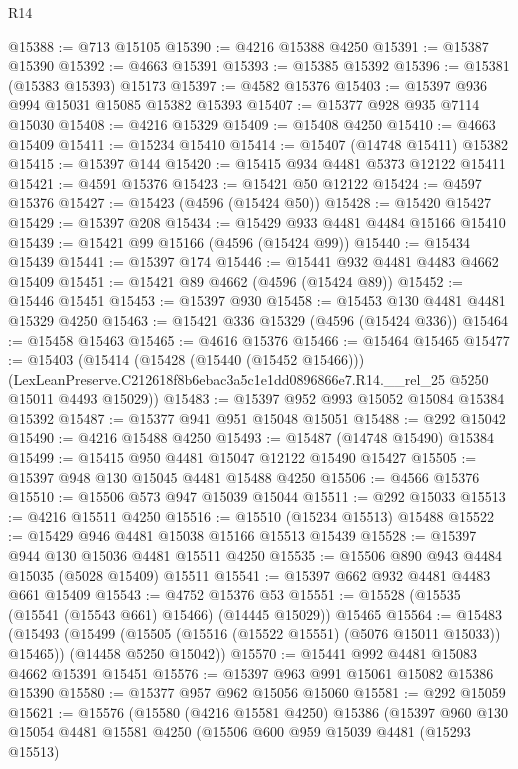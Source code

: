 \begin{lexlean}{R14}
\begin{coremodule}
@15388 := @713 @15105
@15390 := @4216 @15388 @4250
@15391 := @15387 @15390
@15392 := @4663 @15391
@15393 := @15385 @15392
@15396 := @15381 (@15383 @15393) @15173
@15397 := @4582 @15376
@15403 := @15397 @936 @994 @15031 @15085 @15382 @15393
@15407 := @15377 @928 @935 @7114 @15030
@15408 := @4216 @15329
@15409 := @15408 @4250
@15410 := @4663 @15409
@15411 := @15234 @15410
@15414 := @15407 (@14748 @15411) @15382
@15415 := @15397 @144
@15420 := @15415 @934 @4481 @5373 @12122 @15411
@15421 := @4591 @15376
@15423 := @15421 @50 @12122
@15424 := @4597 @15376
@15427 := @15423 (@4596 (@15424 @50))
@15428 := @15420 @15427
@15429 := @15397 @208
@15434 := @15429 @933 @4481 @4484 @15166 @15410
@15439 := @15421 @99 @15166 (@4596 (@15424 @99))
@15440 := @15434 @15439
@15441 := @15397 @174
@15446 := @15441 @932 @4481 @4483 @4662 @15409
@15451 := @15421 @89 @4662 (@4596 (@15424 @89))
@15452 := @15446 @15451
@15453 := @15397 @930
@15458 := @15453 @130 @4481 @4481 @15329 @4250
@15463 := @15421 @336 @15329 (@4596 (@15424 @336))
@15464 := @15458 @15463
@15465 := @4616 @15376
@15466 := @15464 @15465
@15477 := @15403
    (@15414
      (@15428 (@15440 (@15452 @15466)))
      (LexLeanPreserve.C212618f8b6ebac3a5c1e1dd0896866e7.R14.__rel_25 @5250 @15011 @4493 @15029))
@15483 := @15397 @952 @993 @15052 @15084 @15384 @15392
@15487 := @15377 @941 @951 @15048 @15051
@15488 := @292 @15042
@15490 := @4216 @15488 @4250
@15493 := @15487 (@14748 @15490) @15384
@15499 := @15415 @950 @4481 @15047 @12122 @15490 @15427
@15505 := @15397 @948 @130 @15045 @4481 @15488 @4250
@15506 := @4566 @15376
@15510 := @15506 @573 @947 @15039 @15044
@15511 := @292 @15033
@15513 := @4216 @15511 @4250
@15516 := @15510 (@15234 @15513) @15488
@15522 := @15429 @946 @4481 @15038 @15166 @15513 @15439
@15528 := @15397 @944 @130 @15036 @4481 @15511 @4250
@15535 := @15506 @890 @943 @4484 @15035 (@5028 @15409) @15511
@15541 := @15397 @662 @932 @4481 @4483 @661 @15409
@15543 := @4752 @15376 @53
@15551 := @15528 (@15535 (@15541 (@15543 @661) @15466) (@14445 @15029)) @15465
@15564 := @15483
    (@15493
      (@15499 (@15505 (@15516 (@15522 @15551) (@5076 @15011 @15033)) @15465))
      (@14458 @5250 @15042))
@15570 := @15441 @992 @4481 @15083 @4662 @15391 @15451
@15576 := @15397 @963 @991 @15061 @15082 @15386 @15390
@15580 := @15377 @957 @962 @15056 @15060
@15581 := @292 @15059
@15621 := @15576
    (@15580
      (@4216 @15581 @4250)
      @15386
      (@15397
        @960
        @130
        @15054
        @4481
        @15581
        @4250
        (@15506
          @600
          @959
          @15039
          @4481
          (@15293 @15513)

\end{coremodule}
\end{lexlean}
